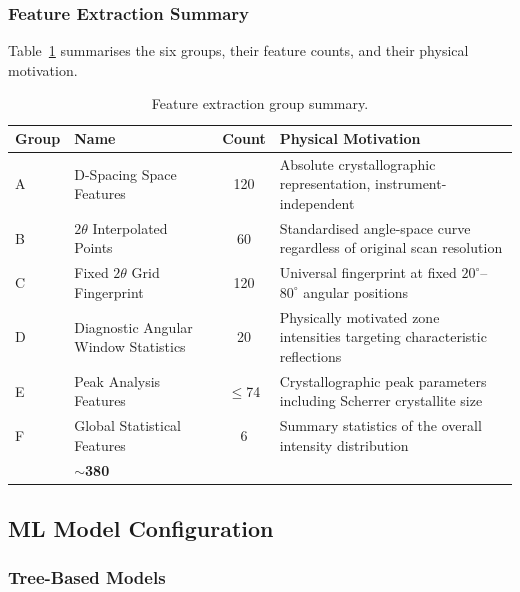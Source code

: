 \documentclass[12pt, oneside]{article} %
\begin{document}
\subsubsection{Feature Extraction Summary}

Table~\ref{tab:feat_summary} summarises the six groups, their feature counts, and their physical motivation.

\begin{table}[H]
\caption{Feature extraction group summary.}
\label{tab:feat_summary}
\vspace{-4mm}
\begin{center}
\begin{tabular}{|>{\raggedright\arraybackslash}p{1.2cm}|>{\raggedright\arraybackslash}p{4.0cm}|c|>{\raggedright\arraybackslash}p{6.5cm}|}
\hline
\textbf{Group} & \textbf{Name} & \textbf{Count} & \textbf{Physical Motivation} \\
\hline
A & D-Spacing Space Features & 120 & Absolute crystallographic representation, instrument-independent \\
\hline
B & $2\theta$ Interpolated Points & 60 & Standardised angle-space curve regardless of original scan resolution \\
\hline
C & Fixed $2\theta$ Grid Fingerprint & 120 & Universal fingerprint at fixed $20^{\circ}$--$80^{\circ}$ angular positions \\
\hline
D & Diagnostic Angular Window Statistics & 20 & Physically motivated zone intensities targeting characteristic reflections \\
\hline
E & Peak Analysis Features & $\leq$74 & Crystallographic peak parameters including Scherrer crystallite size \\
\hline
F & Global Statistical Features & 6 & Summary statistics of the overall intensity distribution \\
\hline
\multicolumn{2}{|l|}{\textbf{Total}} & $\sim$\textbf{380} & \\
\hline
\end{tabular}
\end{center}
\end{table}


\subsection{ML Model Configuration}

\subsubsection{Tree-Based Models}
\end{document}

